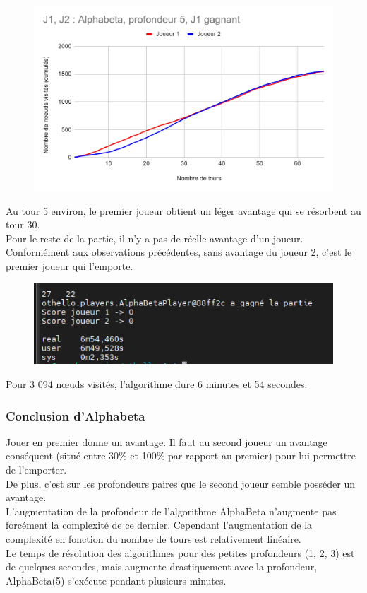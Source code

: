 \documentclass[12pt]{article}
\begin{document}
\begin{figure}[!h]
   \includegraphics[width=\textwidth]{prof5alphabeta.png}
\end{figure}

Au tour 5 environ, le premier joueur obtient un léger avantage qui se résorbent au tour 30.\\
Pour le reste de la partie, il n’y a pas de réelle avantage d’un joueur.\\
Conformément aux observations précédentes, sans avantage du joueur 2, c’est le premier joueur qui l’emporte.

\begin{figure}[!h]
   \includegraphics[width=\textwidth]{prof5alphabeta-console.png}
\end{figure}

Pour 3 094 nœuds visités, l’algorithme dure 6 minutes et 54 secondes. 

\subsubsection{Conclusion d’Alphabeta}

Jouer en premier donne un avantage. Il faut au second joueur un avantage conséquent (situé entre 30\% et 100\% par rapport au premier) pour lui permettre de l’emporter.\\
De plus, c’est sur les profondeurs paires que le second joueur semble posséder un avantage.\\
L’augmentation de la profondeur de l’algorithme AlphaBeta n’augmente pas forcément la complexité de ce dernier. Cependant l’augmentation de la complexité en fonction du nombre de tours est relativement linéaire.\\
Le temps de résolution des algorithmes pour des petites profondeurs (1, 2, 3) est de quelques secondes, mais augmente drastiquement avec la profondeur, AlphaBeta(5) s’exécute pendant plusieurs minutes. 
\end{document}
